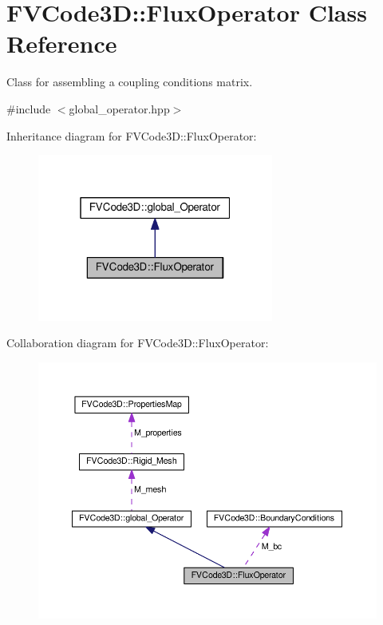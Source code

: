 \hypertarget{classFVCode3D_1_1FluxOperator}{}\section{F\+V\+Code3D\+:\+:Flux\+Operator Class Reference}
\label{classFVCode3D_1_1FluxOperator}


Class for assembling a coupling conditions matrix.  




{\ttfamily \#include $<$global\+\_\+operator.\+hpp$>$}



Inheritance diagram for F\+V\+Code3D\+:\+:Flux\+Operator\+:
\nopagebreak
\begin{figure}[H]
\begin{center}
\leavevmode
\includegraphics[width=220pt]{classFVCode3D_1_1FluxOperator__inherit__graph}
\end{center}
\end{figure}


Collaboration diagram for F\+V\+Code3D\+:\+:Flux\+Operator\+:
\nopagebreak
\begin{figure}[H]
\begin{center}
\leavevmode
\includegraphics[width=350pt]{classFVCode3D_1_1FluxOperator__coll__graph}
\end{center}
\end{figure}
